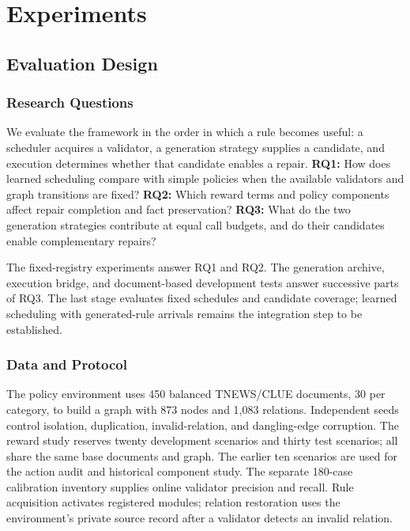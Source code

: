 \section{Experiments}
\label{sec:experiments}

\subsection{Evaluation Design}
\subsubsection{Research Questions}
\label{subsubsec:evaluation_questions}
We evaluate the framework in the order in which a rule becomes useful: a scheduler acquires a validator, a generation strategy supplies a candidate, and execution determines whether that candidate enables a repair. \textbf{RQ1:} How does learned scheduling compare with simple policies when the available validators and graph transitions are fixed? \textbf{RQ2:} Which reward terms and policy components affect repair completion and fact preservation? \textbf{RQ3:} What do the two generation strategies contribute at equal call budgets, and do their candidates enable complementary repairs?

The fixed-registry experiments answer RQ1 and RQ2. The generation archive, execution bridge, and document-based development tests answer successive parts of RQ3. The last stage evaluates fixed schedules and candidate coverage; learned scheduling with generated-rule arrivals remains the integration step to be established.

\subsubsection{Data and Protocol}
\label{subsubsec:testset}
The policy environment uses 450 balanced TNEWS/CLUE documents, 30 per category, to build a graph with 873 nodes and 1,083 relations. Independent seeds control isolation, duplication, invalid-relation, and dangling-edge corruption. The reward study reserves twenty development scenarios and thirty test scenarios; all share the same base documents and graph. The earlier ten scenarios are used for the action audit and historical component study. The separate 180-case calibration inventory supplies online validator precision and recall. Rule acquisition activates registered modules; relation restoration uses the environment's private source record after a validator detects an invalid relation.

